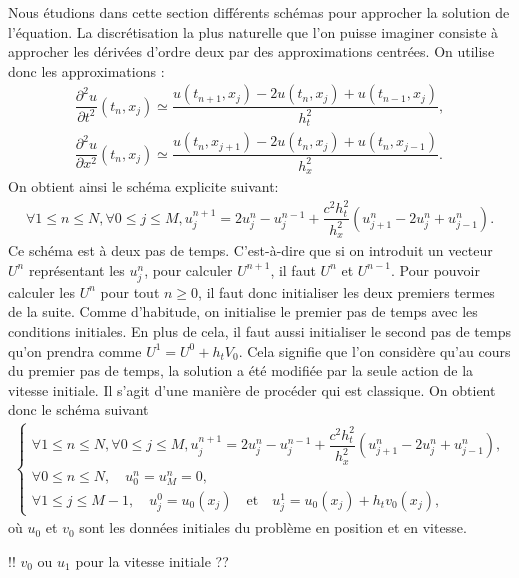 \documentclass[12pt,a4paper,twoside]{article}
\begin{document}
Nous \'etudions dans cette section diff\'erents sch\'emas pour approcher la solution
de l'\'equation.
La discr\'etisation la plus naturelle que l'on puisse imaginer
consiste \`a approcher les d\'eriv\'ees d'ordre deux par des approximations centr\'ees.
On utilise donc les approximations :
\begin{align*}
  \dfrac{\partial^2 u}{\partial t^2}(t_n,x_j) \simeq 
  \dfrac{u(t_{n+1},x_j) - 2 u(t_n,x_j) + u(t_{n-1},x_j)}{h_t^2} ,
  \\
  \dfrac{\partial^2 u}{\partial x^2}(t_n,x_j) \simeq 
  \dfrac{u(t_n,x_{j+1}) - 2 u(t_n,x_{j}) + u(t_n,x_{j-1})}{h_x^2} .
\end{align*}
On obtient ainsi le sch\'ema explicite suivant:
\begin{align*}
  \forall 1 \leq n \leq N, \forall 0 \leq j \leq M,
  u_j^{n+1} = 2 u_j^{n} - u_j^{n-1} + \dfrac{c^2 h_t^2}{h_x^2} (u_{j+1}^{n} - 2 u_{j}^{n}+u_{j-1}^{n}).
\end{align*}
Ce sch\'ema est \`a deux pas de temps.
C'est-\`a-dire que si on introduit un vecteur $U^n$ repr\'esentant les $u_j^n$, 
pour calculer $U^{n+1}$, il faut $U^n$ et $U^{n-1}$.
Pour pouvoir calculer les $U^n$ pour tout $n \geq 0$, il faut donc
initialiser les deux premiers termes de la suite.
Comme d'habitude, on initialise le premier pas de temps avec les conditions initiales.
En plus de cela, il faut aussi initialiser le second pas de temps qu'on prendra comme
$U^{1} = U^0 + h_t V_0$. Cela signifie que l'on consid\`ere qu'au cours du premier pas de temps,
la solution a \'et\'e modifi\'ee par la seule action de la vitesse initiale.
Il s'agit d'une mani\`ere de proc\'eder qui est classique.
On obtient donc le sch\'ema suivant
\begin{align}
  \label{eq:ondes_DF_exp}
  \left\{
  \begin{array}{l}
    \forall 1 \leq n \leq N, \forall 0 \leq j \leq M,
    u_j^{n+1} = 2 u_j^{n} - u_j^{n-1} + \dfrac{c^2 h_t^2}{h_x^2} (u_{j+1}^{n} - 2 u_{j}^{n}+u_{j-1}^{n}) ,
    \\
    \forall 0 \leq n \leq N , \quad
    u_0^n = u_M^n = 0 ,
    \\
    \forall 1 \leq j \leq M-1 ,  \quad
    u_j^0 = u_0(x_j) \quad \text{et} \quad u_j^1 = u_0(x_j) + h_t v_0(x_j) ,
  \end{array}
  \right.
\end{align}
o\`u $u_0$ et $v_0$ sont les donn\'ees initiales du probl\`eme
en position et en vitesse.

!! $v_0$ ou $u_1$ pour la vitesse initiale ??
\end{document}
